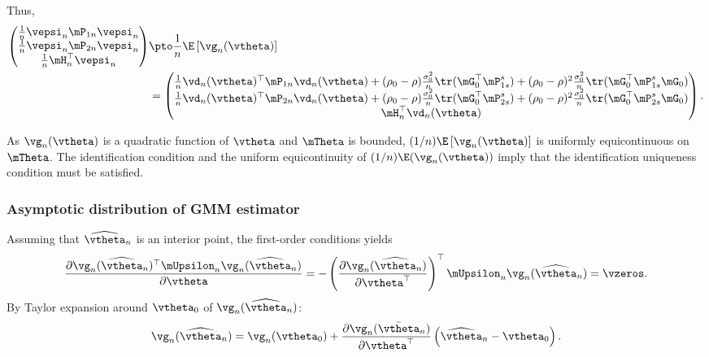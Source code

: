 \documentclass[english,12pt]{book}\usepackage[]{graphicx}\usepackage[]{xcolor}
\begin{document}
Thus, 
\begin{equation*}
\begin{aligned}
\begin{pmatrix}
\frac{1}{n}\vepsi_n\mP_{1n}\vepsi_n \\
\frac{1}{n}\vepsi_n\mP_{2n}\vepsi_n \\
\frac{1}{n}\mH_n^\top \vepsi_n \\
\end{pmatrix}
&\pto \frac{1}{n}\E\left[\vg_n(\vtheta)\right] \\
& = \begin{pmatrix}
 \frac{1}{n}\vd_n(\vtheta)^\top\mP_{1n}\vd_n(\vtheta) + (\rho_0 - \rho) \frac{\sigma_0^2}{n}\tr(\mG_0^\top\mP_{1s}^s) + (\rho_0-\rho)^2\frac{\sigma_0^2}{n}\tr(\mG_0^\top\mP_{1s}^s\mG_0) \\
 \frac{1}{n}\vd_n(\vtheta)^\top\mP_{2n}\vd_n(\vtheta) + (\rho_0 - \rho) \frac{\sigma_0^2}{n}\tr(\mG_0^\top\mP_{2s}^s) + (\rho_0-\rho)^2\frac{\sigma_0^2}{n}\tr(\mG_0^\top\mP_{2s}^s\mG_0) \\
 \mH_n^\top\vd_n(\vtheta)
 \end{pmatrix}.
 \end{aligned}
\end{equation*}

As $\vg_n(\vtheta)$ is a quadratic function of $\vtheta$ and $\mTheta$ is bounded, $(1/n)\E\left[\vg_n(\vtheta)\right]$ is uniformly equicontinuous on $\mTheta$. The identification condition and the uniform equicontinuity of $(1/n)\E(\vg_n(\vtheta))$ imply that the identification uniqueness condition must be satisfied.
\subsubsection{Asymptotic distribution of GMM estimator}
  Assuming that $\widehat{\vtheta}_n$ is an interior point, the first-order conditions yields
  \begin{equation}\label{eq:proof-gmm-2sls-foc}
    \frac{\partial \vg_n(\widehat{\vtheta}_n)^\top\mUpsilon_n\vg_n(\widehat{\vtheta}_n)}{\partial \vtheta} = - \left(\frac{\partial \vg_n(\widehat{\vtheta}_n)}{\partial \vtheta^\top}\right)^\top \mUpsilon_n \vg_n(\widehat{\vtheta}_n) = \vzeros.
  \end{equation}
  By Taylor expansion around $\vtheta_0$ of $\vg_n(\widehat{\vtheta}_n)$:
  \begin{equation}\label{eq:proof-gmm-2sls-taylor}
  \vg_n(\widehat{\vtheta}_n) = \vg_n(\vtheta_0) + \frac{\partial \vg_n(\bar{\vtheta}_n)}{\partial \vtheta^\top}\left(\widehat{\vtheta}_n - \vtheta_0\right).
  \end{equation}
\end{document}
